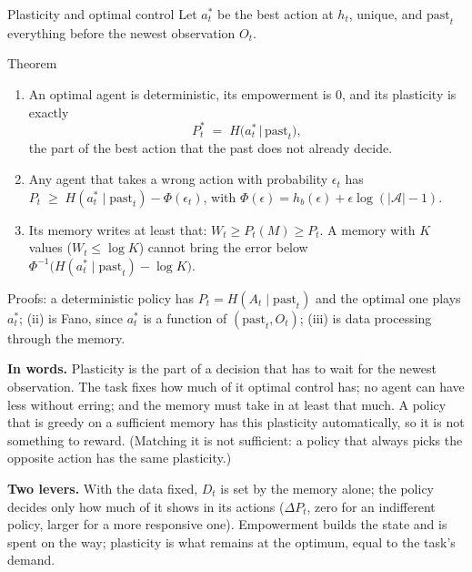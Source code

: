 \documentclass[11pt,aspectratio=169]{beamer}
\begin{document}
\begin{frame}[shrink=6]{Plasticity and optimal control}
Let $a^*_t$ be the best action at $h_t$, unique, and $\mathrm{past}_t$ everything before the newest observation $O_t$.
\begin{block}{Theorem}
\begin{enumerate}
\item[(i)] An optimal agent is deterministic, its empowerment is $0$, and its plasticity is exactly
\[
P^*_t \;=\; H\big(a^*_t \,\big|\, \mathrm{past}_t\big),
\]
the part of the best action that the past does not already decide.
\item[(ii)] Any agent that takes a wrong action with probability $\epsilon_t$ has $P_t \;\ge\; H(a^*_t \mid \mathrm{past}_t) - \Phi(\epsilon_t)$, with $\Phi(\epsilon) = h_b(\epsilon) + \epsilon \log(|\mathcal{A}| - 1)$.
\item[(iii)] Its memory writes at least that: $W_t \ge P_t(M) \ge P_t$. A memory with $K$ values ($W_t \le \log K$) cannot bring the error below $\Phi^{-1}\big(H(a^*_t \mid \mathrm{past}_t) - \log K\big)$.
\end{enumerate}
\end{block}
Proofs: a deterministic policy has $P_t = H(A_t \mid \mathrm{past}_t)$ and the optimal one plays $a^*_t$; (ii) is Fano, since $a^*_t$ is a function of $(\mathrm{past}_t, O_t)$; (iii) is data processing through the memory.

\medskip
\textbf{In words.} Plasticity is the part of a decision that has to wait for the newest observation. The task fixes how much of it optimal control has; no agent can have less without erring; and the memory must take in at least that much. A policy that is greedy on a sufficient memory has this plasticity automatically, so it is not something to reward. (Matching it is not sufficient: a policy that always picks the opposite action has the same plasticity.)

\medskip
\textbf{Two levers.} With the data fixed, $D_t$ is set by the memory alone; the policy decides only how much of it shows in its actions ($\Delta P_t$, zero for an indifferent policy, larger for a more responsive one). Empowerment builds the state and is spent on the way; plasticity is what remains at the optimum, equal to the task's demand.
\end{frame}
\end{document}
